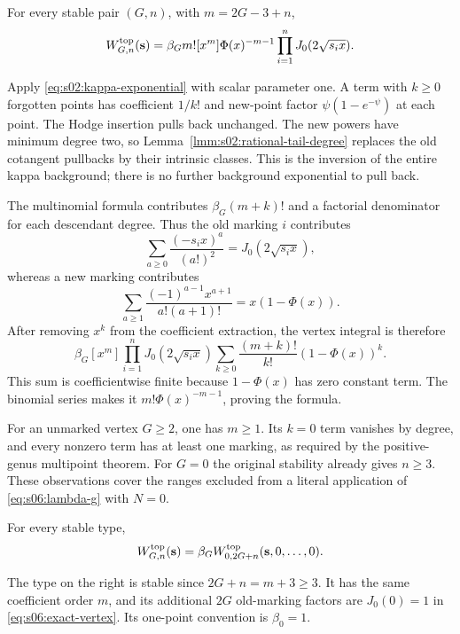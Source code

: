 \begin{prp}\label{prp:s06:exact-vertex}
For every stable pair $(G,n)$, with $m=2G-3+n$,
\begin{equation}\label{eq:s06:exact-vertex}
 W^{\rm top}_{G,n}(\mathbf s)
 =\beta_G m![x^m]\Phi(x)^{-m-1}
                       \prod_{i=1}^n J_0(2\sqrt{s_i x}).
\end{equation}
\end{prp}
\begin{prf}
Apply \eqref{eq:s02:kappa-exponential} with scalar parameter one.
A term with $k\geq0$ forgotten points has coefficient $1/k!$ and
new-point factor $\psi(1-e^{-\psi})$ at each point.
The Hodge insertion pulls back unchanged. The new powers have
minimum degree two, so Lemma~\ref{lmm:s02:rational-tail-degree}
replaces the old cotangent pullbacks by their intrinsic classes.
This is the inversion of the entire kappa background; there is no
further background exponential to pull back.

The multinomial formula contributes $\beta_G(m+k)!$ and a
factorial denominator for each descendant degree. Thus the old
marking $i$ contributes
\[
 \sum_{a\geq0}\frac{(-s_i x)^a}{(a!)^2}
       =J_0(2\sqrt{s_i x}),
\]
whereas a new marking contributes
\[
 \sum_{a\geq1}\frac{(-1)^{a-1}x^{a+1}}{a!(a+1)!}
       =x(1-\Phi(x)).
\]
After removing $x^k$ from the coefficient extraction, the vertex
integral is therefore
\[
 \beta_G[x^m]\prod_{i=1}^nJ_0(2\sqrt{s_i x})
       \sum_{k\geq0}\frac{(m+k)!}{k!}(1-\Phi(x))^k.
\]
This sum is coefficientwise finite because $1-\Phi(x)$ has zero
constant term. The binomial series makes it
$m!\Phi(x)^{-m-1}$, proving the formula.

For an unmarked vertex $G\geq2$, one has $m\geq1$. Its $k=0$
term vanishes by degree, and every nonzero term has at least one
marking, as required by the positive-genus multipoint theorem.
For $G=0$ the original stability already gives $n\geq3$.
These observations cover the ranges excluded from a literal
application of \eqref{eq:s06:lambda-g} with $N=0$.
\end{prf}

\begin{crl}\label{crl:s06:genus-zero}
For every stable type,
\begin{equation}\label{eq:s06:genus-zero}
 W^{\rm top}_{G,n}(\mathbf s)
 =\beta_G W^{\rm top}_{0,2G+n}(\mathbf s,0,\ldots,0).
\end{equation}
\end{crl}
\begin{prf}
The type on the right is stable since $2G+n=m+3\geq3$.
It has the same coefficient order $m$, and its additional $2G$
old-marking factors are $J_0(0)=1$ in
\eqref{eq:s06:exact-vertex}. Its one-point convention is $\beta_0=1$.
\end{prf}

